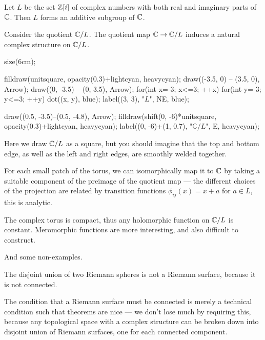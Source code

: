 \begin{example}
	Let $L$ be the set $\mathbb Z[i]$ of complex numbers with both real and imaginary parts of $\mathbb C$.
	Then $L$ forms an additive subgroup of $\mathbb C$.

	Consider the quotient $\mathbb C/L$. The quotient map $\mathbb C \to \mathbb C/L$ induces a natural complex
	structure on $\mathbb C/L$.

	\begin{center}
		\begin{asy}
			size(6cm);

			filldraw(unitsquare, opacity(0.3)+lightcyan, heavycyan);
			draw((-3.5, 0) -- (3.5, 0), Arrow);
			draw((0, -3.5) -- (0, 3.5), Arrow);
			for(int x=-3; x<=3; ++x) for(int y=-3; y<=3; ++y) dot((x, y), blue);
			label((3, 3), "$L$", NE, blue);

			draw((0.5, -3.5)--(0.5, -4.8), Arrow);
			filldraw(shift(0, -6)*unitsquare, opacity(0.3)+lightcyan, heavycyan);
			label((0, -6)+(1, 0.7), "$\mathbb{C}/L$", E, heavycyan);
		\end{asy}
	\end{center}

	Here we draw $\mathbb C/L$ as a square, but you should imagine that the top and bottom edge, as well
	as the left and right edges, are smoothly welded together.

	For each small patch of the torus, we can isomorphically map it to $\mathbb C$ by taking a suitable
	component of the preimage of the quotient map --- the different choices of the projection are
	related by transition functions $\phi_{ij}(x) = x + a$ for $a \in L$, this is analytic.

	The complex torus is compact, thus any holomorphic function on $\mathbb C/L$ is constant. Meromorphic
	functions are more interesting, and also difficult to construct.
\end{example}

And some non-examples.
\begin{example}
	The disjoint union of two Riemann spheres is not a Riemann surface, because it is not connected.
\end{example}
The condition that a Riemann surface must be connected is merely a technical condition such that
theorems are nice --- we don't lose much by requiring this, because any topological space with a
complex structure can be broken down into disjoint union of Riemann surfaces, one for each connected
component.
